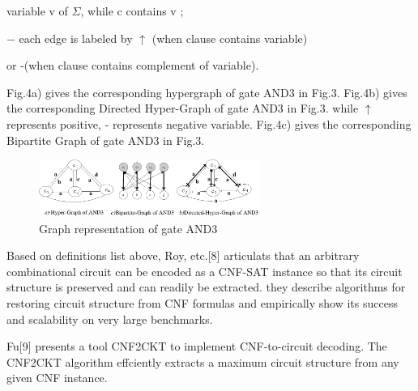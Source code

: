 \documentclass[runningheads,a4paper]{llncs}
\begin{document}
\setlength{\parindent}{5em}  variable v of $\Sigma$, while c contains v ;

\setlength{\parindent}{4em} $-$ each edge is labeled by  $\uparrow$ (when clause contains variable) 

\setlength{\parindent}{5em} or -(when clause contains complement of variable).

\setlength{\parindent}{2em} 

Fig.4a) gives the corresponding hypergraph of gate AND3 in Fig.3. 
Fig.4b) gives the corresponding Directed Hyper-Graph of gate AND3 in Fig.3. while $\uparrow$ represents positive, - represents negative variable.
Fig.4c) gives the corresponding Bipartite Graph of gate AND3 in Fig.3.
\begin{figure}
\centering
\includegraphics[width=7.2cm]{a4}
\caption{Graph representation of gate AND3}
\end{figure}

Based on definitions list above, Roy, etc.[8] articulats that an arbitrary combinational circuit can be encoded as a CNF-SAT instance 
so that its circuit structure is preserved and can readily be extracted. 
they describe algorithms for restoring circuit structure from CNF formulas 
and empirically show its success and scalability on very large benchmarks. 
% 
% 
% 
% 

Fu[9] presents a tool CNF2CKT to implement CNF-to-circuit decoding. The CNF2CKT algorithm effciently extracts a maximum circuit structure from any given CNF instance. 


% 
\end{document}
